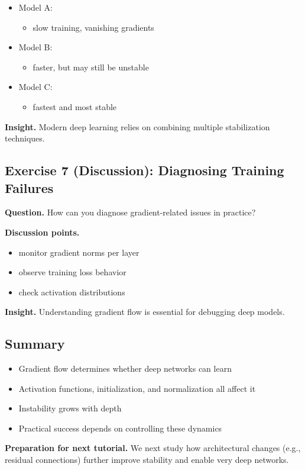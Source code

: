 \begin{itemize}
    \item Model A:
    \begin{itemize}
        \item slow training, vanishing gradients
    \end{itemize}

    \item Model B:
    \begin{itemize}
        \item faster, but may still be unstable
    \end{itemize}

    \item Model C:
    \begin{itemize}
        \item fastest and most stable
    \end{itemize}
\end{itemize}

\medskip

\noindent
\textbf{Insight.}  
Modern deep learning relies on combining multiple stabilization techniques.

\subsection{Exercise 7 (Discussion): Diagnosing Training Failures}

\textbf{Question.}  
How can you diagnose gradient-related issues in practice?

\medskip

\noindent
\textbf{Discussion points.}

\begin{itemize}
    \item monitor gradient norms per layer
    \item observe training loss behavior
    \item check activation distributions
\end{itemize}

\medskip

\noindent
\textbf{Insight.}  
Understanding gradient flow is essential for debugging deep models.

\subsection{Summary}

\begin{itemize}
    \item Gradient flow determines whether deep networks can learn
    \item Activation functions, initialization, and normalization all affect it
    \item Instability grows with depth
    \item Practical success depends on controlling these dynamics
\end{itemize}

\medskip

\noindent
\textbf{Preparation for next tutorial.}  
We next study how architectural changes (e.g., residual connections) further improve stability and enable very deep networks.